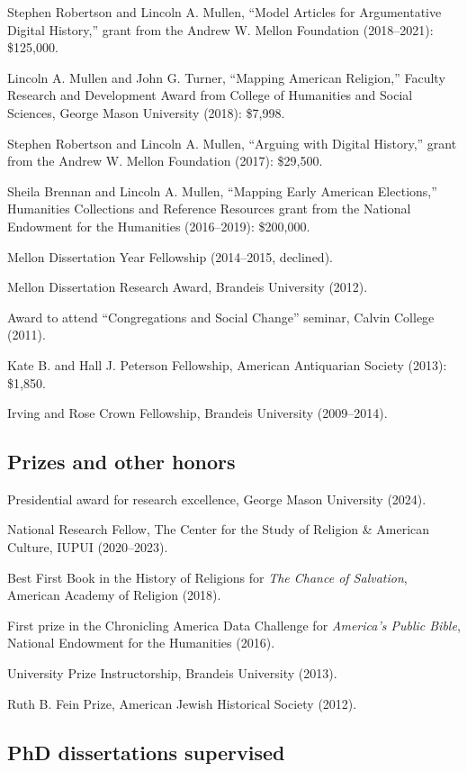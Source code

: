 \documentclass[11pt]{article}
\begin{document}
Stephen Robertson and Lincoln A. Mullen, ``Model Articles for Argumentative Digital History,'' grant from the Andrew W. Mellon Foundation (2018--2021): \$125,000.

Lincoln A. Mullen and John G. Turner, ``Mapping American Religion,'' Faculty Research and Development Award from College of Humanities and Social Sciences, George Mason University (2018): \$7,998.

Stephen Robertson and Lincoln A. Mullen, ``Arguing with Digital History,'' grant from the Andrew W. Mellon Foundation (2017): \$29,500.

Sheila Brennan and Lincoln A. Mullen, ``Mapping Early American Elections,'' Humanities Collections and Reference Resources grant from the National Endowment for the Humanities (2016--2019): \$200,000. 

Mellon Dissertation Year Fellowship (2014--2015, declined).

Mellon Dissertation Research Award, Brandeis University (2012).

Award to attend ``Congregations and Social Change'' seminar, Calvin College (2011).

Kate B. and Hall J. Peterson Fellowship, American Antiquarian Society (2013): \$1,850.

Irving and Rose Crown Fellowship, Brandeis University (2009--2014).

\subsection{Prizes and other honors}\label{Prizes}

Presidential award for research excellence, George Mason University (2024).

National Research Fellow, The Center for the Study of Religion \& American 
Culture, IUPUI (2020--2023).

Best First Book in the History of Religions for \emph{The Chance of Salvation}, American Academy of Religion (2018).

First prize in the Chronicling America Data Challenge for \emph{America's Public Bible}, National Endowment for the Humanities (2016).

University Prize Instructorship, Brandeis University (2013).

Ruth B. Fein Prize, American Jewish Historical Society (2012). 

\subsection{PhD dissertations supervised}\label{Dissertations supervised}
\end{document}

